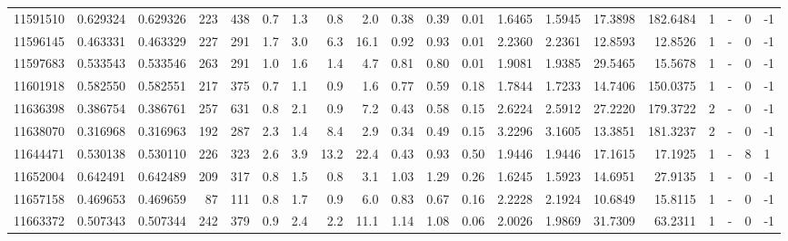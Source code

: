 \begin{tabular}{rrrrrrrrrrrrrrrrrlrl}
  11591510 & 0.629324 &   0.629326 &  223 &  438 &      0.7 &      1.3 &     0.8 &      2.0 &       0.38 &        0.39 &        0.01 &  1.6465 &  1.5945 &   17.3898 &  182.6484 &       1 &             - &        0 &        -1 \\
  11596145 & 0.463331 &   0.463329 &  227 &  291 &      1.7 &      3.0 &     6.3 &     16.1 &       0.92 &        0.93 &        0.01 &  2.2360 &  2.2361 &   12.8593 &   12.8526 &       1 &             - &        0 &        -1 \\
  11597683 & 0.533543 &   0.533546 &  263 &  291 &      1.0 &      1.6 &     1.4 &      4.7 &       0.81 &        0.80 &        0.01 &  1.9081 &  1.9385 &   29.5465 &   15.5678 &       1 &             - &        0 &        -1 \\
  11601918 & 0.582550 &   0.582551 &  217 &  375 &      0.7 &      1.1 &     0.9 &      1.6 &       0.77 &        0.59 &        0.18 &  1.7844 &  1.7233 &   14.7406 &  150.0375 &       1 &             - &        0 &        -1 \\
  11636398 & 0.386754 &   0.386761 &  257 &  631 &      0.8 &      2.1 &     0.9 &      7.2 &       0.43 &        0.58 &        0.15 &  2.6224 &  2.5912 &   27.2220 &  179.3722 &       2 &             - &        0 &        -1 \\
  11638070 & 0.316968 &   0.316963 &  192 &  287 &      2.3 &      1.4 &     8.4 &      2.9 &       0.34 &        0.49 &        0.15 &  3.2296 &  3.1605 &   13.3851 &  181.3237 &       2 &             - &        0 &        -1 \\
  11644471 & 0.530138 &   0.530110 &  226 &  323 &      2.6 &      3.9 &    13.2 &     22.4 &       0.43 &        0.93 &        0.50 &  1.9446 &  1.9446 &   17.1615 &   17.1925 &       1 &             - &        8 &         1 \\
  11652004 & 0.642491 &   0.642489 &  209 &  317 &      0.8 &      1.5 &     0.8 &      3.1 &       1.03 &        1.29 &        0.26 &  1.6245 &  1.5923 &   14.6951 &   27.9135 &       1 &             - &        0 &        -1 \\
  11657158 & 0.469653 &   0.469659 &   87 &  111 &      0.8 &      1.7 &     0.9 &      6.0 &       0.83 &        0.67 &        0.16 &  2.2228 &  2.1924 &   10.6849 &   15.8115 &       1 &             - &        0 &        -1 \\
  11663372 & 0.507343 &   0.507344 &  242 &  379 &      0.9 &      2.4 &     2.2 &     11.1 &       1.14 &        1.08 &        0.06 &  2.0026 &  1.9869 &   31.7309 &   63.2311 &       1 &             - &        0 &        -1 \\

\end{tabular}
